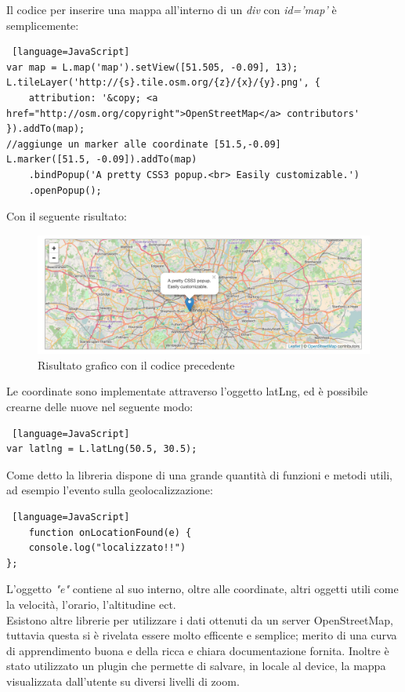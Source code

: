 Il codice per inserire una mappa all'interno di un \textit{div} con \textit{id='map'} è semplicemente:
\begin{lstlisting} [language=JavaScript]
var map = L.map('map').setView([51.505, -0.09], 13);
L.tileLayer('http://{s}.tile.osm.org/{z}/{x}/{y}.png', {
    attribution: '&copy; <a href="http://osm.org/copyright">OpenStreetMap</a> contributors'
}).addTo(map);
//aggiunge un marker alle coordinate [51.5,-0.09]
L.marker([51.5, -0.09]).addTo(map)
    .bindPopup('A pretty CSS3 popup.<br> Easily customizable.')
    .openPopup();
\end{lstlisting}
Con il seguente risultato:
\begin{figure}[H]
	\centering
	\includegraphics[scale=0.4]{Implementazione/leaflet_result.png}
	\caption{Risultato grafico con il codice precedente}
	\label{fig:leaflet_result}
\end{figure}
Le coordinate sono implementate attraverso l'oggetto latLng, ed è possibile crearne delle nuove nel seguente modo:
\begin{lstlisting} [language=JavaScript]
var latlng = L.latLng(50.5, 30.5);
\end{lstlisting}
Come detto la libreria dispone di una grande quantità di funzioni e metodi utili, ad esempio l'evento sulla geolocalizzazione:
\begin{lstlisting} [language=JavaScript]
	function onLocationFound(e) {
	console.log("localizzato!!")
};
\end{lstlisting}
L'oggetto \textit{"e"} contiene al suo interno, oltre alle coordinate, altri oggetti utili come la velocità, l'orario, l'altitudine ect.\\
Esistono altre librerie per utilizzare i dati ottenuti da un server OpenStreetMap, tuttavia questa si è rivelata essere molto efficente e semplice; merito di una curva di apprendimento buona e della ricca e chiara documentazione fornita. Inoltre è stato utilizzato un plugin che permette di salvare, in locale al device, la mappa visualizzata dall'utente su diversi livelli di zoom.

